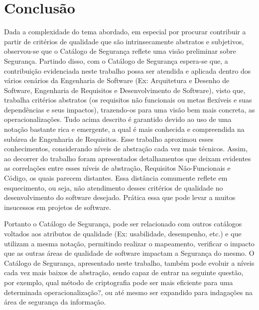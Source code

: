 \chapter{Conclusão}
\label{chap:consideracoesFinais}



Dada a complexidade do tema abordado, em especial por procurar contribuir a partir de critérios de qualidade que são intrinsecamente abstratos e subjetivos, observou-se que o Catálogo de Segurança reflete uma visão preliminar sobre Segurança. Partindo disso, com o Catálogo de Segurança espera-se que, a contribuição evidenciada neste trabalho possa ser atendida e aplicada dentro dos vários cenários da Engenharia de Software (Ex: Arquitetura e Desenho de Software, Engenharia de Requisitos e Desenvolvimento de Software), visto que, trabalha critérios abstratos (os requisitos não funcionais ou metas flexíveis e suas dependências e seus impactos), trazendo-os para uma visão bem mais concreta, as operacionalizações. Tudo acima descrito é garantido devido ao uso de uma notação bastante rica e emergente, a qual é  mais conhecida e compreendida na subárea de Engenharia de Requisitos. Esse trabalho aproximou esses conhecimentos, considerando níveis de abstração cada vez mais técnicos. Assim, ao decorrer do trabalho foram apresentados detalhamentos que deixam evidentes as correlações entre esses níveis de abstração, Requisitos Não-Funcionais e Código, os quais parecem distantes. Essa distância comumente reflete em esquecimento, ou seja, não atendimento desses critérios de qualidade no desenvolvimento do software desejado. Prática essa que pode levar a muitos insucessos em projetos de software. 

Portanto o Catálogo de Segurança, pode ser relacionado com outros catálogos voltados aos atributos de qualidade (Ex: usabilidade, desempenho, etc.) e que utilizam a mesma notação, permitindo realizar o mapeamento, verificar o impacto que as outras áreas de qualidade de software impactam a Segurança do mesmo. O Catálogo de Segurança, apresentado neste trabalho, também pode evoluir a níveis cada vez mais baixos de abstração, sendo capaz de entrar na seguinte questão, por exemplo, qual método de criptografia pode ser mais eficiente para uma determinada operacionalização?, ou até mesmo ser expandido para indagações na área de segurança da informação.  


\begin{comment}
	Prática essa que pode levar a muitos insucessos, tais como o Caso da Ambulância de Londres \cite{finkelstein1996comedy}.
\end{comment}
 


